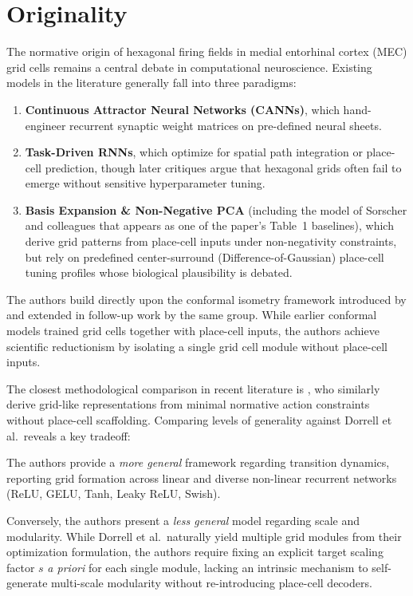 \documentclass[10pt,letterpaper]{article}
\begin{document}
\section{Originality} \label{sec:originality}
The normative origin of hexagonal firing fields in medial entorhinal cortex (MEC) grid cells remains a central debate in computational neuroscience. Existing models in the literature generally fall into three paradigms:
\begin{enumerate}
    \item \textbf{Continuous Attractor Neural Networks (CANNs)}, which hand-engineer recurrent synaptic weight matrices on pre-defined neural sheets.
    \item \textbf{Task-Driven RNNs}, which optimize for spatial path integration or place-cell prediction, though later critiques argue that hexagonal grids often fail to emerge without sensitive hyperparameter tuning.
    \item \textbf{Basis Expansion \& Non-Negative PCA} (including the model of Sorscher and colleagues that appears as one of the paper's Table~1 baselines), which derive grid patterns from place-cell inputs under non-negativity constraints, but rely on predefined center-surround (Difference-of-Gaussian) place-cell tuning profiles whose biological plausibility is debated.
\end{enumerate}

The authors build directly upon the conformal isometry framework introduced by \citet{gao2021path} and extended in follow-up work by the same group. While earlier conformal models trained grid cells together with place-cell inputs, the authors achieve scientific reductionism by isolating a single grid cell module without place-cell inputs. 

The closest methodological comparison in recent literature is \citet{dorrell2023actionable}, who similarly derive grid-like representations from minimal normative action constraints without place-cell scaffolding. Comparing levels of generality against Dorrell et al.\ reveals a key tradeoff:

The authors provide a \emph{more general} framework regarding transition dynamics, reporting grid formation across linear and diverse non-linear recurrent networks (ReLU, GELU, Tanh, Leaky ReLU, Swish).

Conversely, the authors present a \emph{less general} model regarding scale and modularity. While Dorrell et al.\ naturally yield multiple grid modules from their optimization formulation, the authors require fixing an explicit target scaling factor $s$ \emph{a priori} for each single module, lacking an intrinsic mechanism to self-generate multi-scale modularity without re-introducing place-cell decoders.
\end{document}
